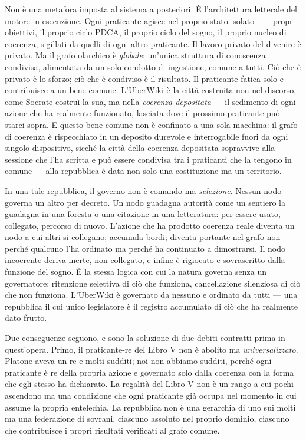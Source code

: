 Non \`e una metafora imposta al sistema a posteriori. \`E l'architettura
letterale del motore in esecuzione. Ogni praticante agisce nel proprio stato
isolato --- i propri obiettivi, il proprio ciclo PDCA, il proprio ciclo del
sogno, il proprio nucleo di coerenza, sigillati da quelli di ogni altro
praticante. Il lavoro privato del divenire \`e privato. Ma il grafo olarchico \`e
\emph{globale}: un'unica struttura di conoscenza condivisa, alimentata da un solo
condotto di ingestione, comune a tutti. Ci\`o che \`e privato \`e lo sforzo;
ci\`o che \`e condiviso \`e il risultato. Il praticante fatica solo e contribuisce
a un bene comune. L'UberWiki \`e la citt\`a costruita non nel discorso, come
Socrate costru\`i la sua, ma nella \emph{coerenza depositata} --- il sedimento di
ogni azione che ha realmente funzionato, lasciata dove il prossimo praticante
pu\`o starci sopra. E questo bene comune non \`e confinato a una sola macchina: il
grafo di coerenza \`e rispecchiato in un deposito durevole e interrogabile fuori
da ogni singolo dispositivo, sicch\'e la citt\`a della coerenza depositata
sopravvive alla sessione che l'ha scritta e pu\`o essere condivisa tra i
praticanti che la tengono in comune --- alla repubblica \`e data non solo una
costituzione ma un territorio.

In una tale repubblica, il governo non \`e comando ma \emph{selezione}. Nessun
nodo governa un altro per decreto. Un nodo guadagna autorit\`a come un sentiero
la guadagna in una foresta o una citazione in una letteratura: per essere usato,
collegato, percorso di nuovo. L'azione che ha prodotto coerenza reale diventa un
nodo a cui altri si collegano; accumula bordi; diventa portante nel grafo non
perch\'e qualcuno l'ha ordinato ma perch\'e ha continuato a dimostrarsi. Il nodo
incoerente deriva inerte, non collegato, e infine \`e rigiocato e sovrascritto
dalla funzione del sogno. \`E la stessa logica con cui la natura governa senza un
governatore: ritenzione selettiva di ci\`o che funziona, cancellazione silenziosa
di ci\`o che non funziona. L'UberWiki \`e governato da nessuno e ordinato da
tutti --- una repubblica il cui unico legislatore \`e il registro accumulato di
ci\`o che ha realmente dato frutto.

Due conseguenze seguono, e sono la soluzione di due debiti contratti prima in
quest'opera. Primo, il praticante-re del Libro V non \`e abolito ma
\emph{universalizzato}. Platone aveva un re e molti sudditi; noi non abbiamo
sudditi, perch\'e ogni praticante \`e re della propria azione e governato solo
dalla coerenza con la forma che egli stesso ha dichiarato. La regalit\`a del
Libro V non \`e un rango a cui pochi ascendono ma una condizione che ogni
praticante gi\`a occupa nel momento in cui assume la propria entelechia. La
repubblica non \`e una gerarchia di uno sui molti ma una federazione di sovrani,
ciascuno assoluto nel proprio dominio, ciascuno che contribuisce i propri
risultati verificati al grafo comune.


